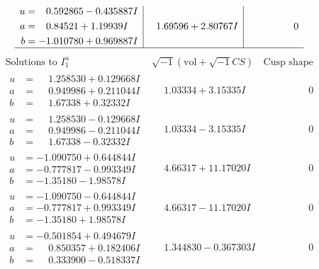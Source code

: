 \documentclass[1p]{elsarticle_modified}
\theoremstyle{definition}
\newcommand{\I}{\sqrt{-1}}
\begin{document}
$$\begin{array}{c|c|c}
\begin{aligned}
u &= \phantom{-}0.592865 - 0.435887 I \\
a &= \phantom{-}0.84521 + 1.19939 I \\
b &= -1.010780 + 0.969887 I\end{aligned}
 & \phantom{-}1.69596 + 2.80767 I & \phantom{-0.000000 } 0\\
 \hline 
 \end{array}$$\newpage$$\begin{array}{c|c|c}  
\text{Solutions to }I^u_{1}& \I (\text{vol} + \sqrt{-1}CS) & \text{Cusp shape}\\
 \hline 
\begin{aligned}
u &= \phantom{-}1.258530 + 0.129668 I \\
a &= \phantom{-}0.949986 + 0.211044 I \\
b &= \phantom{-}1.67338 + 0.32332 I\end{aligned}
 & \phantom{-}1.03334 + 3.15335 I & \phantom{-0.000000 } 0 \\ \hline\begin{aligned}
u &= \phantom{-}1.258530 - 0.129668 I \\
a &= \phantom{-}0.949986 - 0.211044 I \\
b &= \phantom{-}1.67338 - 0.32332 I\end{aligned}
 & \phantom{-}1.03334 - 3.15335 I & \phantom{-0.000000 } 0 \\ \hline\begin{aligned}
u &= -1.090750 + 0.644844 I \\
a &= -0.777817 - 0.993349 I \\
b &= -1.35180 - 1.98578 I\end{aligned}
 & \phantom{-}4.66317 + 11.17020 I & \phantom{-0.000000 } 0 \\ \hline\begin{aligned}
u &= -1.090750 - 0.644844 I \\
a &= -0.777817 + 0.993349 I \\
b &= -1.35180 + 1.98578 I\end{aligned}
 & \phantom{-}4.66317 - 11.17020 I & \phantom{-0.000000 } 0 \\ \hline\begin{aligned}
u &= -0.501854 + 0.494679 I \\
a &= \phantom{-}0.850357 + 0.182406 I \\
b &= \phantom{-}0.333900 - 0.518337 I\end{aligned}
 & \phantom{-}1.344830 - 0.367303 I & \phantom{-0.000000 } 0 \\ \hline\begin{aligned}

\end{aligned}
\end{array}$$
\end{document}
